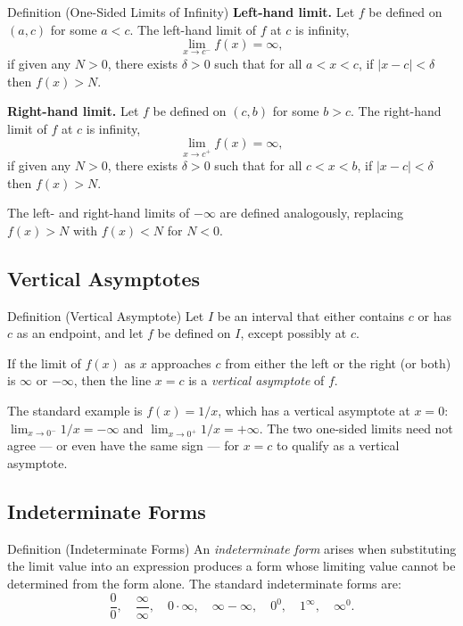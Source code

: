 \begin{propositionbox}{Definition (One-Sided Limits of Infinity)}
\textbf{Left-hand limit.}
Let $f$ be defined on $(a, c)$ for some $a < c$.
The left-hand limit of $f$ at $c$ is infinity,
\[
  \lim_{x \to c^-} f(x) = \infty,
\]
if given any $N > 0$, there exists $\delta > 0$ such that for all
$a < x < c$, if $|x - c| < \delta$ then $f(x) > N$.

\medskip
\textbf{Right-hand limit.}
Let $f$ be defined on $(c, b)$ for some $b > c$.
The right-hand limit of $f$ at $c$ is infinity,
\[
  \lim_{x \to c^+} f(x) = \infty,
\]
if given any $N > 0$, there exists $\delta > 0$ such that for all
$c < x < b$, if $|x - c| < \delta$ then $f(x) > N$.

\medskip
The left- and right-hand limits of $-\infty$ are defined analogously,
replacing $f(x) > N$ with $f(x) < N$ for $N < 0$.
\end{propositionbox}

\subsection*{Vertical Asymptotes}

\begin{propositionbox}{Definition (Vertical Asymptote)}
Let $I$ be an interval that either contains $c$ or has $c$ as an
endpoint, and let $f$ be defined on $I$, except possibly at $c$.

If the limit of $f(x)$ as $x$ approaches $c$ from either the left
or the right (or both) is $\infty$ or $-\infty$, then the line
$x = c$ is a \emph{vertical asymptote} of $f$.
\end{propositionbox}

\begin{remark*}
The standard example is $f(x) = 1/x$, which has a vertical asymptote
at $x = 0$: $\lim_{x \to 0^-} 1/x = -\infty$ and
$\lim_{x \to 0^+} 1/x = +\infty$.
The two one-sided limits need not agree --- or even have the same
sign --- for $x = c$ to qualify as a vertical asymptote.
\end{remark*}

\subsection*{Indeterminate Forms}

\begin{propositionbox}{Definition (Indeterminate Forms)}
An \emph{indeterminate form} arises when substituting the limit
value into an expression produces a form whose limiting value
cannot be determined from the form alone.
The standard indeterminate forms are:
\[
  \frac{0}{0}, \quad
  \frac{\infty}{\infty}, \quad
  0 \cdot \infty, \quad
  \infty - \infty, \quad
  0^0, \quad
  1^\infty, \quad
  \infty^0.
\]
\end{propositionbox}

